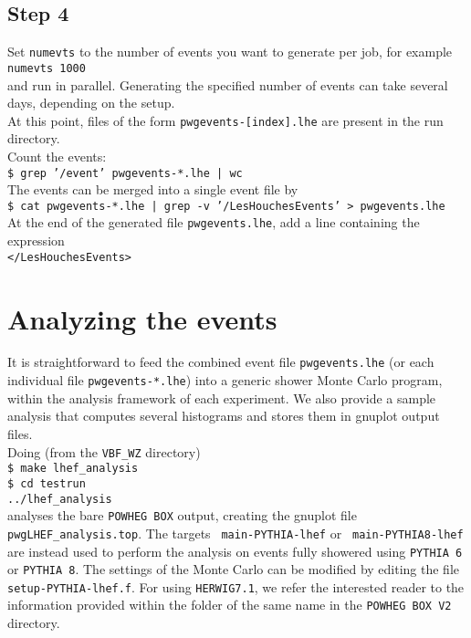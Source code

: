 \documentclass[a4paper,11pt]{article}
\newcommand\POWHEGBOXV{{\tt POWHEG~BOX~V2}}
\begin{document}
\subsection*{Step 4}
%
Set {\tt numevts} to the number of events you want to generate per
job, for example
\\[2ex]
{\tt numevts 1000} 
\\[2ex]
and run in parallel. 
Generating the specified number of
events can take several days, depending on the setup.
\\[2ex]
At this point, files of the form {\tt pwgevents-[index].lhe} are
present in the run directory.
\\[2ex]
Count the events:
\\[2ex]
{\tt \$ grep '/event' pwgevents-*.lhe | wc}
\\[2ex]
The events can be merged into a single event file by
\\[2ex]
{\tt \$ cat pwgevents-*.lhe | grep -v '/LesHouchesEvents' >
  pwgevents.lhe}
\\[2ex]
At the end of the generated file {\tt pwgevents.lhe}, add a line containing the expression
\\[2ex]
{\tt </LesHouchesEvents>}


\section*{Analyzing the events}
%
It is straightforward to feed the combined event file {\tt pwgevents.lhe} (or each individual file {\tt pwgevents-*.lhe}) into a generic
shower Monte Carlo program, within the analysis framework of each
experiment. We also provide a sample analysis that computes several
histograms and stores them in gnuplot output files.
\\[2ex]
Doing (from the {\tt VBF\_WZ} directory)
\\[2ex]
{\tt \$ make lhef\_analysis}
\\[2ex]
{\tt \$ cd testrun}
\\[2ex]
{\tt ../lhef\_analysis}
\\[2ex]
analyses the bare {\tt POWHEG BOX} output, creating the gnuplot file
{\tt pwgLHEF\_analysis.top}. The targets {\tt
  main-PYTHIA-lhef} or {\tt
  main-PYTHIA8-lhef} are instead used to perform the analysis on events
fully showered using  {\tt PYTHIA 6} or {\tt PYTHIA 8}. The settings of
the Monte Carlo can be modified by editing the file {\tt setup-PYTHIA-lhef.f}. For using \texttt{HERWIG7.1}, we refer the interested reader to the information provided within the folder of the same name in the \POWHEGBOXV{} directory.
\end{document}
